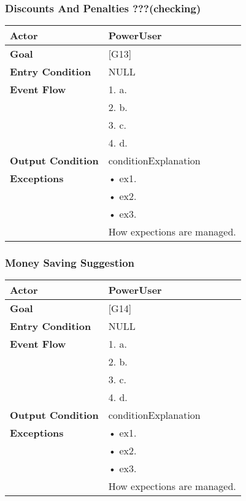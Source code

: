 \subsubsection{Discounts And Penalties ???(checking)}
\begin{tabular}{| l | p{8cm} |}
\hline
\textbf{Actor}      &       PowerUser \\
\hline
\textbf{Goal}       &       [G13]\\
\hline
\textbf{Entry Condition} &  NULL\\
\hline
\textbf{Event Flow}     &   1.	a.\\&
                                            2.	b.\\&
                                            3.	c.\\&
                                            4.  d.\\
\hline
\textbf{Output Condition} & conditionExplanation\\
\hline
\textbf{Exceptions} &       •   ex1.\\& 
                            •	ex2.\\&
                            •	ex3.\\& 
                           How expections are managed.\\
\hline
\end{tabular} 


\subsubsection{Money Saving Suggestion}
\begin{tabular}{| l | p{8cm} |}
\hline
\textbf{Actor}      &       PowerUser \\
\hline
\textbf{Goal}       &       [G14]\\
\hline
\textbf{Entry Condition} &  NULL\\
\hline
\textbf{Event Flow}     &   1.	a.\\&
                                            2.	b.\\&
                                            3.	c.\\&
                                            4.  d.\\
\hline
\textbf{Output Condition} & conditionExplanation\\
\hline
\textbf{Exceptions} &       •   ex1.\\& 
                            •	ex2.\\&
                            •	ex3.\\& 
                           How expections are managed.\\
\hline
\end{tabular} 


